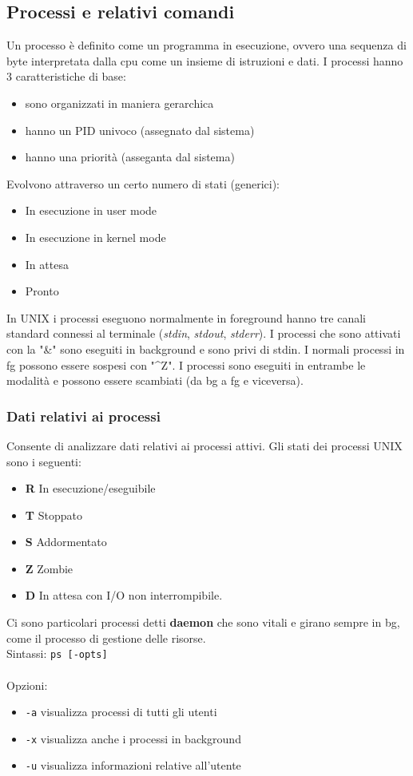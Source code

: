 \documentclass[a4paper, 10pt]{article}
\begin{document}
\subsection{Processi e relativi comandi}
Un processo è definito come un programma in esecuzione, ovvero una sequenza di byte interpretata dalla cpu come un insieme di istruzioni e dati. I processi hanno 3 caratteristiche di base:
\begin{itemize}
\item sono organizzati in maniera gerarchica
\item hanno un PID univoco (assegnato dal sistema)
\item hanno una priorità (asseganta dal sistema)
\end{itemize}
Evolvono attraverso un certo numero di stati (generici):
\begin{itemize}
\item In esecuzione in user mode
\item In esecuzione in kernel mode
\item In attesa
\item Pronto
\end{itemize}
In UNIX i processi eseguono normalmente in foreground hanno tre canali standard connessi al terminale (\textit{stdin}, \textit{stdout}, \textit{stderr}). I processi che sono attivati con la "\&" sono eseguiti in background e sono privi di stdin. I normali processi in fg possono essere sospesi con "\^{}Z". I processi sono eseguiti in entrambe le modalità e possono essere scambiati (da bg a fg e viceversa).

\subsubsection{Dati relativi ai processi} Consente di analizzare dati relativi ai processi attivi. Gli stati dei processi UNIX sono  i seguenti:
\begin{itemize}
\item \textbf{R} In esecuzione/eseguibile
\item \textbf{T} Stoppato
\item \textbf{S} Addormentato
\item \textbf{Z} Zombie
\item \textbf{D} In attesa con I/O non interrompibile.
\end{itemize}
Ci sono particolari processi detti \textbf{daemon} che sono vitali e girano sempre in bg, come il processo di gestione delle risorse. \\
Sintassi:
\verb|ps [-opts]| \\ \\
Opzioni:
\begin{itemize}
\item \verb|-a| visualizza processi di tutti gli utenti
\item \verb|-x| visualizza anche i processi in background
\item \verb|-u| visualizza informazioni relative all'utente
\end{itemize}
\end{document}
